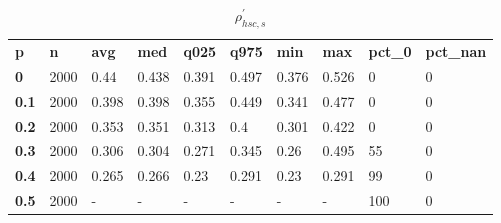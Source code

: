 \begin{table}[h]
 \centering 
\footnotesize
\caption{$\rho_{hsc,s}^\prime $}
\label{tab:alphahscs}
\begin{tabular}[h]{| l l l l l l l l l l|
    } \hline
\textbf{ p} & \textbf{ n} & \textbf{ avg} & \textbf{ med} & \textbf{ q025} & \textbf{ q975} & \textbf{ min} & \textbf{ max} & \textbf{ pct\_0} & \textbf{ pct\_nan}
           \\
  \textbf{  0} & 2000 &  0.44 & 0.438 & 0.391 & 0.497 & 0.376 & 0.526 &   0 & 0
           \\
  \textbf{0.1} & 2000 & 0.398 & 0.398 & 0.355 & 0.449 & 0.341 & 0.477 &   0 & 0
           \\
  \textbf{0.2} & 2000 & 0.353 & 0.351 & 0.313 &   0.4 & 0.301 & 0.422 &   0 & 0
           \\
  \textbf{0.3} & 2000 & 0.306 & 0.304 & 0.271 & 0.345 &  0.26 & 0.495 &  55 & 0
           \\
  \textbf{0.4} & 2000 & 0.265 & 0.266 &  0.23 & 0.291 &  0.23 & 0.291 &  99 & 0
           \\
  \textbf{0.5} & 2000 & - & - & - & - & - & - & 100 & 0
           \\
 \hline \end{tabular}
 \end{table}
